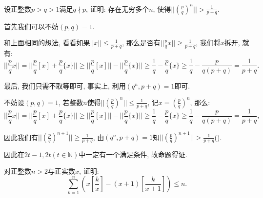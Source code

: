 \documentclass[lang=cn,12pt,thmcnt=section]{elegantbook}
\renewcommand{\note}[1]{({\kaishu\dashuline{#1}})}
\begin{document}
\begin{example}
设正整数$p>q>1$满足$q\nmid p$, 证明: 存在无穷多个$n$, 使得$||\left(\frac{p}{q}\right)^n||>\frac{1}{p+q}$.
\end{example}

\begin{analysis}
首先我们可以不妨$(p,q)=1$.

和上面相同的想法, 看看如果$||x||\le \frac{1}{p+q}$, 那么是否有$||\frac{p}{q}x||\ge \frac{1}{p+q}$, 我们将$x$拆开, 就有: 
\[
||\frac{p}{q}x||= ||\frac{p}{q}[x]+\frac{p}{q}\{x\}||\ge ||\frac{p}{q}[x]||-||\frac{p}{q}\{x\}||\ge \frac{1}{q}-\frac{p}{q}\{x\}\ge \frac{1}{q}-\frac{p}{q(p+q)}=\frac{1}{p+q}.
\]

最后, 我们只需不取等即可, 事实上, 利用$(q^n,p+q)=1$即可.
\end{analysis}

\begin{solution}
不妨设$(p,q)=1$, 若整数$n$使得$||\left(\frac{p}{q}\right)^n||\le \frac{1}{p+q}$, 记$x=\left(\frac{p}{q}\right)^n$, 那么: 
\[
||\frac{p}{q}x||= ||\frac{p}{q}[x]+\frac{p}{q}\{x\}||\ge ||\frac{p}{q}[x]||-||\frac{p}{q}\{x\}||\ge \frac{1}{q}-\frac{p}{q}\{x\}\ge \frac{1}{q}-\frac{p}{q(p+q)}=\frac{1}{p+q},
\]

因此我们有$||\left(\frac{p}{q}\right)^{n+1}||\ge \frac{1}{p+q}$, 由$(q^n,p+q)=1$知$||\left(\frac{p}{q}\right)^{n+1}||> \frac{1}{p+q}$\note{因为最简分母一定不同}.

因此在$2t-1,2t(t\in \mathbb{N})$中一定有一个满足条件, 故命题得证.
\end{solution}


\begin{example}
对正整数$n>2$与正实数$x$, 证明: 
\[
\sum_{k=1}^n \left(x\left[\frac{k}{x}\right]-(x+1)\left[\frac{k}{x+1}\right]\right)\le n.
\]
\end{example}
\end{document}
